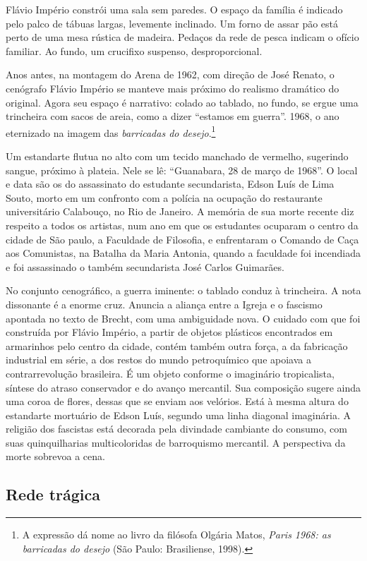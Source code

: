 Flávio Império constrói uma sala sem paredes. O espaço da família é
indicado pelo palco de tábuas largas, levemente inclinado. Um forno de
assar pão está perto de uma mesa rústica de madeira. Pedaços da rede de
pesca indicam o ofício familiar. Ao fundo, um crucifixo suspenso,
desproporcional.

Anos antes, na montagem do Arena de 1962, com direção de José Renato, o
cenógrafo Flávio Império se manteve mais próximo do realismo dramático
do original. Agora seu espaço é narrativo: colado ao tablado, no fundo,
se ergue uma trincheira com sacos de areia, como a dizer “estamos em
guerra”. 1968, o ano eternizado na imagem das {\it barricadas do
desejo}.\footnote{A expressão dá nome ao livro da filósofa Olgária Matos,
  {\it Paris 1968: as barricadas do desejo} (São Paulo: Brasiliense,
  1998).}

Um estandarte flutua no alto com um tecido manchado de vermelho,
sugerindo sangue, próximo à plateia. Nele se lê: “Guanabara, 28 de março
de 1968”. O local e data são os do assassinato do estudante
secundarista, Edson Luís de Lima Souto, morto em um confronto com a
polícia na ocupação do restaurante universitário Calabouço, no Rio de
Janeiro. A memória de sua morte recente diz respeito a todos os
artistas, num ano em que os estudantes ocuparam o centro da cidade de
São paulo, a Faculdade de Filosofia, e enfrentaram o Comando de Caça aos
Comunistas, na Batalha da Maria Antonia, quando a faculdade foi
incendiada e foi assassinado o também secundarista José Carlos
Guimarães.

No conjunto cenográfico, a guerra iminente: o tablado conduz à
trincheira. A nota dissonante é a enorme cruz. Anuncia a aliança entre a
Igreja e o fascismo apontada no texto de Brecht, com uma ambiguidade
nova. O cuidado com que foi construída por Flávio Império, a partir de
objetos plásticos encontrados em armarinhos pelo centro da cidade,
contém também outra força, a da fabricação industrial em série, a dos
restos do mundo petroquímico que apoiava a contrarrevolução brasileira.
É um objeto conforme o imaginário tropicalista, síntese do atraso
conservador e do avanço mercantil. Sua composição sugere ainda uma coroa
de flores, dessas que se enviam aos velórios. Está à mesma altura do
estandarte mortuário de Edson Luís, segundo uma linha diagonal
imaginária. A religião dos fascistas está decorada pela divindade
cambiante do consumo, com suas quinquilharias multicoloridas de
barroquismo mercantil. A perspectiva da morte sobrevoa a cena.

\subsection{Rede trágica}

